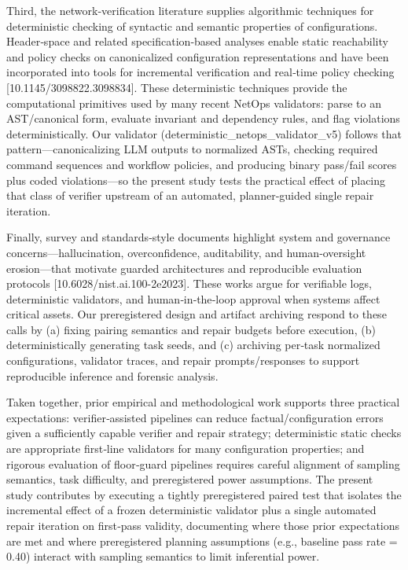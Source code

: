 \documentclass[conference]{IEEEtran}
\begin{document}
Third, the network‑verification literature supplies algorithmic techniques for deterministic checking of syntactic and semantic properties of configurations. Header‑space and related specification‑based analyses enable static reachability and policy checks on canonicalized configuration representations and have been incorporated into tools for incremental verification and real‑time policy checking [10.1145/3098822.3098834]. These deterministic techniques provide the computational primitives used by many recent NetOps validators: parse to an AST/canonical form, evaluate invariant and dependency rules, and flag violations deterministically. Our validator (deterministic\_netops\_validator\_v5) follows that pattern---canonicalizing LLM outputs to normalized ASTs, checking required command sequences and workflow policies, and producing binary pass/fail scores plus coded violations---so the present study tests the practical effect of placing that class of verifier upstream of an automated, planner‑guided single repair iteration.

Finally, survey and standards‑style documents highlight system and governance concerns---hallucination, overconfidence, auditability, and human‑oversight erosion---that motivate guarded architectures and reproducible evaluation protocols [10.6028/nist.ai.100-2e2023]. These works argue for verifiable logs, deterministic validators, and human‑in‑the‑loop approval when systems affect critical assets. Our preregistered design and artifact archiving respond to these calls by (a) fixing pairing semantics and repair budgets before execution, (b) deterministically generating task seeds, and (c) archiving per‑task normalized configurations, validator traces, and repair prompts/responses to support reproducible inference and forensic analysis.

Taken together, prior empirical and methodological work supports three practical expectations: verifier‑assisted pipelines can reduce factual/configuration errors given a sufficiently capable verifier and repair strategy; deterministic static checks are appropriate first‑line validators for many configuration properties; and rigorous evaluation of floor‑guard pipelines requires careful alignment of sampling semantics, task difficulty, and preregistered power assumptions. The present study contributes by executing a tightly preregistered paired test that isolates the incremental effect of a frozen deterministic validator plus a single automated repair iteration on first‑pass validity, documenting where those prior expectations are met and where preregistered planning assumptions (e.g., baseline pass rate = 0.40) interact with sampling semantics to limit inferential power.
\end{document}
